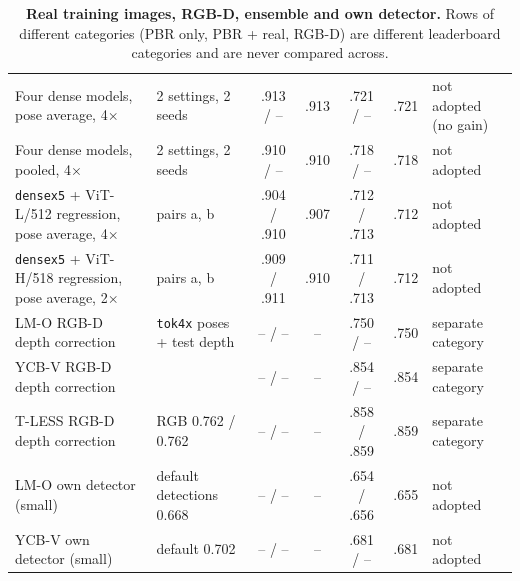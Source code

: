 \begin{table}[t]
\begin{tabular}{@{}llccccl@{}}
    Four dense models, pose average, 4$\times$ & 2 settings, 2 seeds & .913 / -- & .913 & .721 / -- & .721 & not adopted (no gain) \\
    Four dense models, pooled, 4$\times$ & 2 settings, 2 seeds & .910 / -- & .910 & .718 / -- & .718 & not adopted \\
    \texttt{densex5} + ViT-L/512 regression, pose average, 4$\times$ & pairs a, b & .904 / .910 & .907 & .712 / .713 & .712 & not adopted \\
    \texttt{densex5} + ViT-H/518 regression, pose average, 2$\times$ & pairs a, b & .909 / .911 & .910 & .711 / .713 & .712 & not adopted \\
    LM-O RGB-D depth correction & \texttt{tok4x} poses + test depth & -- / -- & -- & .750 / -- & .750 & separate category \\
    YCB-V RGB-D depth correction &  & -- / -- & -- & .854 / -- & .854 & separate category \\
    T-LESS RGB-D depth correction & RGB 0.762 / 0.762 & -- / -- & -- & .858 / .859 & .859 & separate category \\
    LM-O own detector (small) & default detections 0.668 & -- / -- & -- & .654 / .656 & .655 & not adopted \\
    YCB-V own detector (small) & default 0.702 & -- / -- & -- & .681 / -- & .681 & not adopted \\
    \bottomrule
  \end{tabular}
  \caption{\textbf{Real training images, RGB-D, ensemble and own detector.} Rows of different categories (PBR only, PBR + real, RGB-D) are different leaderboard categories and are never compared across.}
  \label{tab:cat_other}
\end{table}

